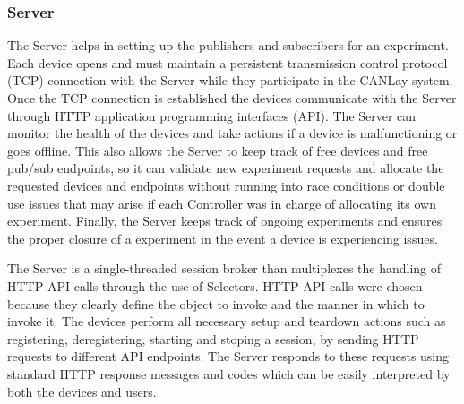 \documentclass[letterpaper,twocolumn,10pt]{article}
\begin{document}
\subsubsection{Server}
The Server helps in setting up the publishers and subscribers for an experiment. Each device opens and must maintain a persistent transmission control protocol (TCP) connection with the Server while they participate in the CANLay system. Once the TCP connection is established the devices communicate with the Server through HTTP application programming interfaces (API). The Server can monitor the health of the devices and take actions if a device is malfunctioning or goes offline. This also allows the Server to keep track of free devices and free pub/sub endpoints, so it can validate new experiment requests and allocate the requested devices and endpoints without running into race conditions or double use issues that may arise if each Controller was in charge of allocating its own experiment. Finally, the Server keeps track of ongoing experiments and ensures the proper closure of a experiment in the event a device is experiencing issues.

The Server is a single-threaded session broker than multiplexes the handling of HTTP API calls through the use of Selectors. HTTP API calls were chosen because they clearly define the object to invoke and the manner in which to invoke it. The devices perform all necessary setup and teardown actions such as registering, deregistering, starting and stoping a session, by sending HTTP requests to different API endpoints. The Server responds to these requests using standard HTTP response messages and codes which can be easily interpreted by both the devices and users.


\end{document}
